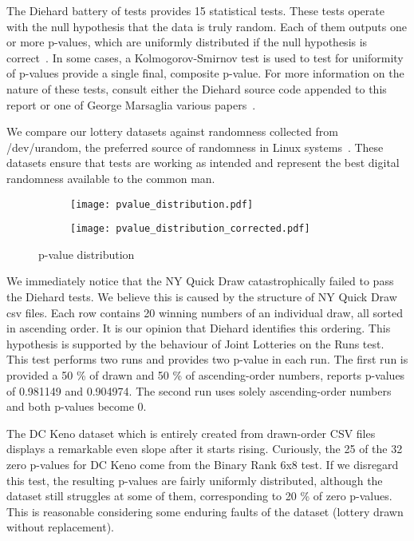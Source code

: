 The Diehard battery of tests provides 15 statistical tests. These tests operate with the null hypothesis that the data is truly random.
Each of them outputs one or more p-values, which are uniformly distributed if the null hypothesis is correct~\cite{NISTBible}.
In some cases, a Kolmogorov-Smirnov test is used to test for uniformity of p-values provide a single final, composite p-value. For more
information on the nature of these tests, consult either the Diehard source code appended to this report or one of George Marsaglia various
papers~\cite{monkey,mindist}.

We compare our lottery datasets against randomness collected from /dev/urandom, the preferred source of randomness in Linux
systems~\cite{manrandom,mythsrandom}. These datasets ensure that tests are working as intended and represent the best digital randomness
available to the common man.

\begin{figure}
    \centering
    \captionsetup[subfigure]{justification=centering}
    \begin{subfigure}{0.495\textwidth}
        \texttt{[image: pvalue\_distribution.pdf]}
        \label{fig:pvalue_distribution}
    \end{subfigure}
    \hfill
    \begin{subfigure}{0.495\textwidth}
        \texttt{[image: pvalue\_distribution\_corrected.pdf]}
        \label{fig:pvalue_corrected}
    \end{subfigure}
    \caption{p-value distribution}
\end{figure}

We immediately notice that the NY Quick Draw catastrophically failed to pass the Diehard tests. We believe this is caused
by the structure of NY Quick Draw csv files. Each row contains 20 winning numbers of an individual draw, all sorted in ascending
order. It is our opinion that Diehard identifies this ordering. This hypothesis is supported by the behaviour of Joint Lotteries
on the Runs test. This test performs two runs and provides two p-value in each run. The first run is provided a 50 \% of drawn
and 50 \% of ascending-order numbers, reports p-values of 0.981149 and 0.904974. The second run uses solely ascending-order
numbers and both p-values become 0.

The DC Keno dataset which is entirely created from drawn-order CSV files displays a remarkable even slope after it starts rising.
Curiously, the 25 of the 32 zero p-values for DC Keno come from the Binary Rank 6x8 test. If we disregard this test,
the resulting p-values are fairly uniformly distributed, although the dataset still struggles at some of them, corresponding to
20 \% of zero p-values. This is reasonable considering some enduring faults of the dataset (lottery drawn without replacement).

